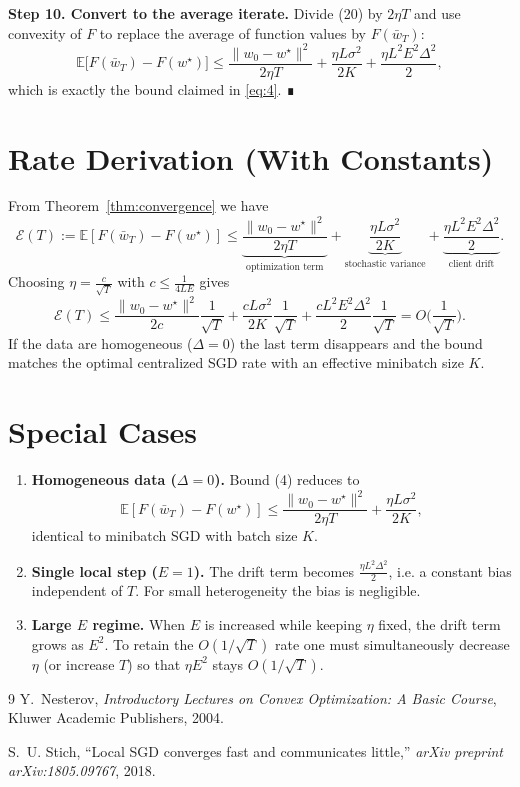 \documentclass[11pt]{article}
\newcommand{\E}{\mathbb{E}}
\begin{document}
\bigskip
\noindent\textbf{Step 10.  Convert to the average iterate.}  
Divide (20) by $2\eta T$ and use convexity of $F$ to replace the average of function values by $F(\bar w_T)$:
\[
\E\!\big[F(\bar w_T)-F(w^\star)\big]
\le
\frac{\|w_0-w^\star\|^2}{2\eta T}
+\frac{\eta L\sigma^2}{2K}
+\frac{\eta L^2E^2\Delta^2}{2},
\]
which is exactly the bound claimed in \eqref{eq:4}.  ∎

\section*{Rate Derivation (With Constants)}
From Theorem~\ref{thm:convergence} we have
\[
\mathcal{E}(T):=\E[F(\bar w_T)-F(w^\star)]
\le
\underbrace{\frac{\|w_0-w^\star\|^2}{2\eta T}}_{\text{optimization term}}
+
\underbrace{\frac{\eta L\sigma^2}{2K}}_{\text{stochastic variance}}
+
\underbrace{\frac{\eta L^2E^2\Delta^2}{2}}_{\text{client drift}} .
\]
Choosing $\eta = \frac{c}{\sqrt{T}}$ with $c\le\frac{1}{4LE}$ gives
\[
\mathcal{E}(T)\le
\frac{\|w_0-w^\star\|^2}{2c}\frac{1}{\sqrt{T}}
+\frac{cL\sigma^2}{2K}\frac{1}{\sqrt{T}}
+\frac{cL^2E^2\Delta^2}{2}\frac{1}{\sqrt{T}}
= O\!\Big(\frac{1}{\sqrt{T}}\Big).
\]
If the data are homogeneous ($\Delta=0$) the last term disappears and the bound matches the optimal centralized SGD rate with an effective minibatch size $K$.

\section*{Special Cases}
\begin{enumerate}[label=\alph*)]
\item \textbf{Homogeneous data ($\Delta=0$).}  
Bound (4) reduces to
\[
\E[F(\bar w_T)-F(w^\star)]\le \frac{\|w_0-w^\star\|^2}{2\eta T}+ \frac{\eta L\sigma^2}{2K},
\]
identical to minibatch SGD with batch size $K$.
\item \textbf{Single local step ($E=1$).}  
The drift term becomes $\frac{\eta L^2\Delta^2}{2}$, i.e. a constant bias independent of $T$.  For small heterogeneity the bias is negligible.
\item \textbf{Large $E$ regime.}  
When $E$ is increased while keeping $\eta$ fixed, the drift term grows as $E^2$.  To retain the $O(1/\sqrt{T})$ rate one must simultaneously decrease $\eta$ (or increase $T$) so that $\eta E^2$ stays $O(1/\sqrt{T})$.
\end{enumerate}

\begin{thebibliography}{9}
Y.~Nesterov, \emph{Introductory Lectures on Convex Optimization: A Basic Course}, Kluwer Academic Publishers, 2004.

S.~U. Stich, ``Local SGD converges fast and communicates little,'' \emph{arXiv preprint arXiv:1805.09767}, 2018.
\end{thebibliography}
\end{document}
